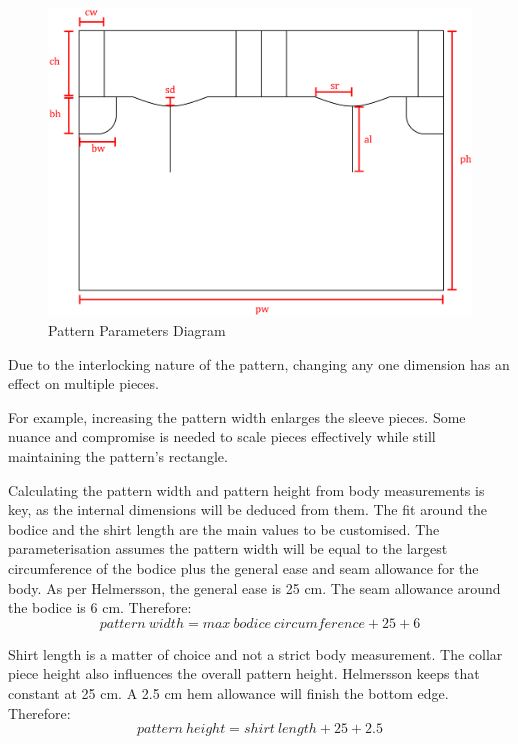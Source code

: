 \newpage
\begin{figure} [H]
    \centering
    \includegraphics[width = \textwidth]{Images/pattern params.png}
    \caption{Pattern Parameters Diagram}
    \label{fig:pattern params}
\end{figure}

Due to the interlocking nature of the pattern, changing any one dimension has an effect on multiple pieces.

For example, increasing the pattern width enlarges the sleeve pieces. Some nuance and compromise is needed to scale pieces effectively while still maintaining the pattern’s rectangle.

Calculating the pattern width and pattern height from body measurements is key, as the internal dimensions will be deduced from them. The fit around the bodice and the shirt length are the main values to be customised. The parameterisation assumes the pattern width will be equal to the largest circumference of the bodice plus the general ease and seam allowance for the body.
As per Helmersson, the general ease is 25 cm. The seam allowance around the bodice is 6 cm. Therefore: 
\begin{equation}
    pattern\ width = max\ bodice\ circumference + 25 + 6
    \label{eq:pattern width}
\end{equation}

Shirt length is a matter of choice and not a strict body measurement. The collar piece height also influences the overall pattern height. Helmersson keeps that constant at 25 cm. A 2.5 cm hem allowance will finish the bottom edge. Therefore:
\begin{equation}
    pattern\ height = shirt\ length + 25 + 2.5
    \label{eq:pattern height}
\end{equation}


